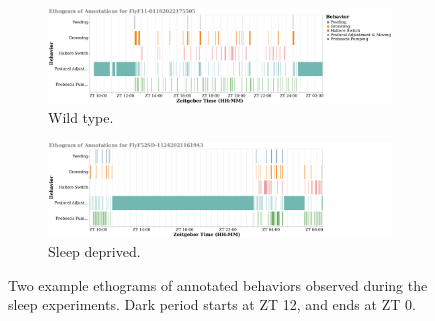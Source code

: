 \begin{figure}[ht!]
	\centering
	\begin{subfigure}[ht!]{0.95\linewidth}
		\centering\includegraphics[width=\linewidth]{figures/FlyF11-01182022175505_annotation_ethogram.pdf}
		\caption{Wild type.}
	\end{subfigure}%

	\centering
	\begin{subfigure}[ht!]{0.95\linewidth}
		\centering\includegraphics[width=\linewidth]{figures/FlyF52SD-11242021161943_annotation_ethogram.pdf}
		\caption{Sleep deprived.}
	\end{subfigure}%
	\caption[Two example ethograms of annotated behaviors observed during the sleep experiments.]{Two example ethograms of annotated behaviors observed during the sleep experiments. Dark period starts at ZT 12, and ends at ZT 0.}
\end{figure}
